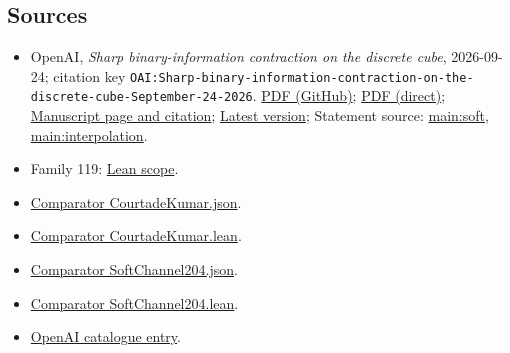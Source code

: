 \documentclass[11pt]{article}
\begin{document}
\subsection{Sources}
\begin{itemize}
\item OpenAI, \emph{Sharp binary-information contraction on the discrete cube}, 2026-09-24; citation key \texttt{OAI:Sharp-binary-information-contraction-on-the-discrete-cube-September-24-2026}. \href{https://github.com/openai/math/blob/adc7f1241b42e322a6451854ab7e4b4c146bf78a/preprints/Sharp-binary-information-contraction-on-the-discrete-cube-September-24-2026/main.pdf}{PDF (GitHub)}; \href{https://github.com/openai/math/raw/adc7f1241b42e322a6451854ab7e4b4c146bf78a/preprints/Sharp-binary-information-contraction-on-the-discrete-cube-September-24-2026/main.pdf}{PDF (direct)}; \href{https://github.com/openai/math/blob/adc7f1241b42e322a6451854ab7e4b4c146bf78a/preprints/Sharp-binary-information-contraction-on-the-discrete-cube-September-24-2026/README.md}{Manuscript page and citation}; \href{https://github.com/openai/math/blob/main/preprints/Sharp-binary-information-contraction-on-the-discrete-cube-September-24-2026/main.pdf}{Latest version}; Statement source: \href{https://github.com/openai/math/blob/adc7f1241b42e322a6451854ab7e4b4c146bf78a/preprints/Sharp-binary-information-contraction-on-the-discrete-cube-September-24-2026/build/main.tex\#L72}{main:soft, main:interpolation}.
\item Family 119: \href{https://github.com/openai/math/blob/adc7f1241b42e322a6451854ab7e4b4c146bf78a/lean/docs/119.md}{Lean scope}.
\item \href{https://github.com/openai/math/blob/adc7f1241b42e322a6451854ab7e4b4c146bf78a/lean/ComparatorChallenges/CourtadeKumar.json}{Comparator CourtadeKumar.json}.
\item \href{https://github.com/openai/math/blob/adc7f1241b42e322a6451854ab7e4b4c146bf78a/lean/ComparatorChallenges/CourtadeKumar.lean}{Comparator CourtadeKumar.lean}.
\item \href{https://github.com/openai/math/blob/adc7f1241b42e322a6451854ab7e4b4c146bf78a/lean/ComparatorChallenges/SoftChannel204.json}{Comparator SoftChannel204.json}.
\item \href{https://github.com/openai/math/blob/adc7f1241b42e322a6451854ab7e4b4c146bf78a/lean/ComparatorChallenges/SoftChannel204.lean}{Comparator SoftChannel204.lean}.
\item \href{https://github.com/openai/math/blob/adc7f1241b42e322a6451854ab7e4b4c146bf78a/CONTENTS.md}{OpenAI catalogue entry}.
\end{itemize}
\end{document}
